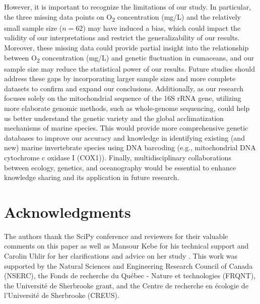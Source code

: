 However, it is important to recognize the limitations of our study. In particular, the three missing data points on O\textsubscript{2} concentration (mg/L) and the relatively small sample size ($n=62$) may have induced a bias, which could impact the validity of our interpretations and restrict the generalizability of our results. Moreover, these missing data could provide partial insight into the relationship between O\textsubscript{2} concentration (mg/L) and genetic fluctuation in cumaceans, and our sample size may reduce the statistical power of our results. Future studies should address these gaps by incorporating larger sample sizes and more complete datasets to confirm and expand our conclusions. Additionally, as our research focuses solely on the mitochondrial sequence of the 16S rRNA gene, utilizing more elaborate genomic methods, such as whole-genome sequencing, could help us better understand the genetic variety and the global acclimatization mechanisms of marine species. This would provide more comprehensive genetic databases to improve our accuracy and knowledge in identifying existing (and new) marine invertebrate species using DNA barcoding (e.g., mitochondrial DNA cytochrome c oxidase I (COX1)). Finally, multidisciplinary collaborations between ecology, genetics, and oceanography would be essential to enhance knowledge sharing and its application in future research.

\section{Acknowledgments}\label{acknowledgments}
The authors thank the SciPy conference and reviewers for their valuable comments on this paper as well as Mansour Kebe for his technical support and Carolin Uhlir for her clarifications and advice on her study \citep{uhlir_adding_2021}. This work was supported by the Natural Sciences and Engineering Research Council of Canada (NSERC), the Fonds de recherche du Québec - Nature et technologies (FRQNT), the Université de Sherbrooke grant, and the Centre de recherche en écologie de l’Université de Sherbrooke (CREUS).
